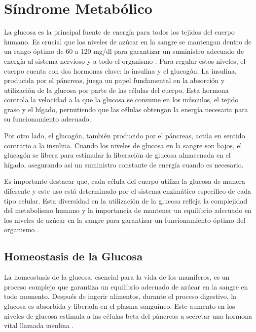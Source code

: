 \chapter{Síndrome Metabólico}\label{insulina}

La glucosa es la principal fuente de energía para todos los tejidos del cuerpo humano. Es crucial que los niveles de azúcar en la sangre se mantengan dentro de un rango óptimo de 60 a 120 mg/dl para garantizar un suministro adecuado de energía al sistema nervioso y a todo el organismo \cite{ImgHomeos}. Para regular estos niveles, el cuerpo cuenta con dos hormonas clave: la insulina y el glucagón. La insulina, producida por el páncreas, juega un papel fundamental en la absorción y utilización de la glucosa por parte de las células del cuerpo. Esta hormona controla la velocidad a la que la glucosa se consume en los músculos, el tejido graso y el hígado, permitiendo que las células obtengan la energía necesaria para su funcionamiento adecuado.

Por otro lado, el glucagón, también producido por el páncreas, actúa en sentido contrario a la insulina. Cuando los niveles de glucosa en la sangre son bajos, el glucagón se libera para estimular la liberación de glucosa almacenada en el hígado, asegurando así un suministro constante de energía cuando es necesario.

Es importante destacar que, cada célula del cuerpo utiliza la glucosa de manera diferente y este uso está determinado por el sistema enzimático específico de cada tipo celular. Esta diversidad en la utilización de la glucosa refleja la complejidad del metabolismo humano y la importancia de mantener un equilibrio adecuado en los niveles de azúcar en la sangre para garantizar un funcionamiento óptimo del organismo \cite{capitulo4Metabolic}.


\section{Homeostasis de la Glucosa}

La homeostasis de la glucosa, esencial para la vida de los mamíferos, es un proceso complejo que garantiza un equilibrio adecuado de azúcar en la sangre en todo momento. Después de ingerir alimentos, durante el proceso digestivo, la glucosa es absorbida y liberada en el plasma sanguíneo. Este aumento en los niveles de glucosa estimula a las células beta del páncreas a secretar una hormona vital llamada insulina \cite{capitulo4Metabolic}.

